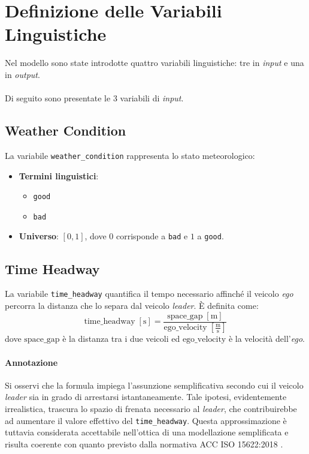 \section{Definizione delle Variabili Linguistiche}

Nel modello sono state introdotte quattro variabili linguistiche: tre in \emph{input} e una in \emph{output}.
\\\\
Di seguito sono presentate le 3 variabili di \emph{input}.

\subsection{Weather Condition}
La variabile \texttt{weather\_condition} rappresenta lo stato meteorologico:
\begin{itemize}
  \item \textbf{Termini linguistici}: 
    \begin{itemize}
      \item \texttt{good}
      \item \texttt{bad}
    \end{itemize}
  \item \textbf{Universo}: \([0,1]\), dove \(0\) corrisponde a \texttt{bad} e \(1\) a \texttt{good}.
\end{itemize}

\subsection{Time Headway}
La variabile \texttt{time\_headway} quantifica il tempo necessario affinché il veicolo \emph{ego} 
percorra la distanza che lo separa dal veicolo \emph{leader}. È definita come:
\[
\text{time\_headway} \; [\mathrm{s}]
= \frac{\text{space\_gap}\;[\mathrm{m}]}{\text{ego\_velocity}\;[\frac{\mathrm{m}}{\mathrm{s}}]}
\]
dove \(\text{space\_gap}\) è la distanza tra i due veicoli ed \(\text{ego\_velocity}\) è la velocità dell'\emph{ego}. 
\paragraph{Annotazione} Si osservi che la formula impiega l'assunzione semplificativa 
secondo cui il veicolo \emph{leader} sia in grado di arrestarsi istantaneamente. 
Tale ipotesi, evidentemente irrealistica, trascura lo spazio di frenata necessario al \emph{leader}, 
che contribuirebbe ad aumentare il valore effettivo del \texttt{time\_headway}. Questa approssimazione 
è tuttavia considerata accettabile nell'ottica di una modellazione semplificata e risulta coerente con quanto 
previsto dalla normativa ACC ISO 15622:2018 \cite{iso15622}.


